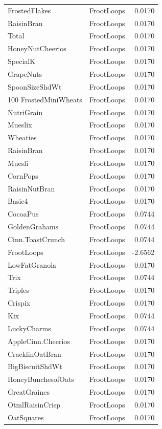 \begin{longtable}{llr}
FrostedFlakes & FrootLoops & 0.0170 \\
RaisinBran & FrootLoops & 0.0170 \\
Total & FrootLoops & 0.0170 \\
HoneyNutCheerios & FrootLoops & 0.0170 \\
SpecialK & FrootLoops & 0.0170 \\
GrapeNuts & FrootLoops & 0.0170 \\
SpoonSizeShdWt & FrootLoops & 0.0170 \\
100%
FrostedMiniWheats & FrootLoops & 0.0170 \\
NutriGrain & FrootLoops & 0.0170 \\
Mueslix & FrootLoops & 0.0170 \\
Wheaties & FrootLoops & 0.0170 \\
RaisinBran & FrootLoops & 0.0170 \\
Muesli & FrootLoops & 0.0170 \\
CornPops & FrootLoops & 0.0170 \\
RaisinNutBran & FrootLoops & 0.0170 \\
Basic4 & FrootLoops & 0.0170 \\
CocoaPus & FrootLoops & 0.0744 \\
GoldenGrahams & FrootLoops & 0.0744 \\
Cinn.ToastCrunch & FrootLoops & 0.0744 \\
FrootLoops & FrootLoops & -2.6562 \\
LowFatGranola & FrootLoops & 0.0170 \\
Trix & FrootLoops & 0.0744 \\
Triples & FrootLoops & 0.0170 \\
Crispix & FrootLoops & 0.0170 \\
Kix & FrootLoops & 0.0744 \\
LuckyCharms & FrootLoops & 0.0744 \\
AppleCinn.Cheerios & FrootLoops & 0.0170 \\
CracklinOatBran & FrootLoops & 0.0170 \\
BigBiscuitShdWt & FrootLoops & 0.0170 \\
HoneyBunchesofOats & FrootLoops & 0.0170 \\
GreatGraines & FrootLoops & 0.0170 \\
OtmlRaisinCrisp & FrootLoops & 0.0170 \\
OatSquares & FrootLoops & 0.0170 \\

\end{longtable}
